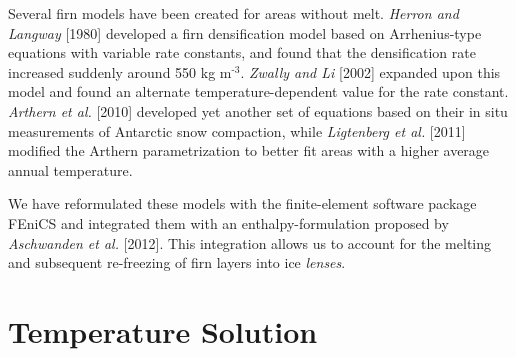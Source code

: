 \documentclass{article}%
\newcommand{\sups}[1]{\ensuremath{^{\textrm{#1}}}}
\begin{document}
Several firn models have been created for areas without melt.  \emph{Herron and Langway} [1980] developed a firn densification model based on Arrhenius-type equations with variable rate constants, and found that the densification rate increased suddenly around 550 kg m\sups{-3}.  \emph{Zwally and Li} [2002] expanded upon this model and found an alternate temperature-dependent value for the rate constant.  \emph{Arthern et al.} [2010] developed yet another set of equations based on their in situ measurements of Antarctic snow compaction, while \emph{Ligtenberg et al.} [2011] modified the Arthern parametrization to better fit areas with a higher average annual temperature. 

We have reformulated these models with the finite-element software package FEniCS and integrated them with an enthalpy-formulation proposed by \emph{Aschwanden et al.} [2012].  This integration allows us to account for the melting and subsequent re-freezing of firn layers into ice \emph{lenses}.  



\section{Temperature Solution}
\end{document}
